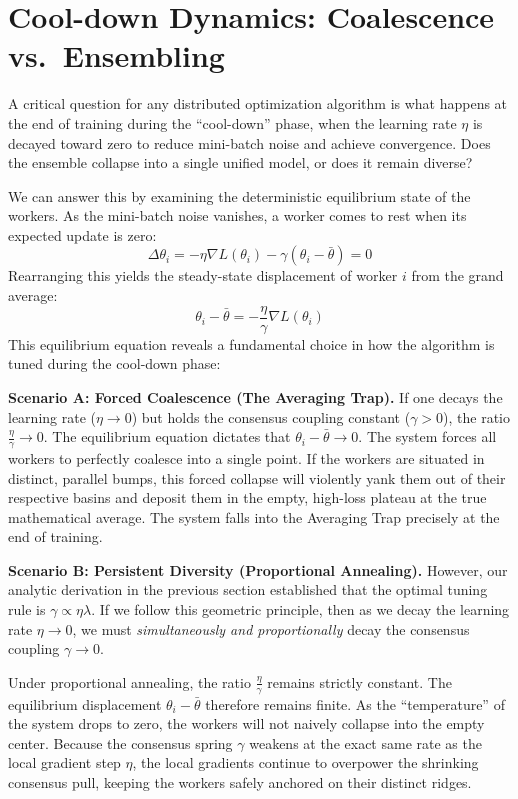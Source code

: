 \documentclass{article}
\begin{document}
\section{Cool-down Dynamics: Coalescence vs.\ Ensembling}

A critical question for any distributed optimization algorithm is what happens at the end of training during the ``cool-down'' phase, when the learning rate $\eta$ is decayed toward zero to reduce mini-batch noise and achieve convergence. Does the ensemble collapse into a single unified model, or does it remain diverse?

We can answer this by examining the deterministic equilibrium state of the workers. As the mini-batch noise vanishes, a worker comes to rest when its expected update is zero:
\[
\Delta \theta_i = -\eta \nabla L(\theta_i) - \gamma(\theta_i - \bar{\theta}) = 0
\]
Rearranging this yields the steady-state displacement of worker $i$ from the grand average:
\[
\theta_i - \bar{\theta} = -\frac{\eta}{\gamma} \nabla L(\theta_i)
\]
This equilibrium equation reveals a fundamental choice in how the algorithm is tuned during the cool-down phase:

\textbf{Scenario A: Forced Coalescence (The Averaging Trap).} If one decays the learning rate ($\eta \to 0$) but holds the consensus coupling constant ($\gamma > 0$), the ratio $\frac{\eta}{\gamma} \to 0$. The equilibrium equation dictates that $\theta_i - \bar{\theta} \to 0$. The system forces all workers to perfectly coalesce into a single point. If the workers are situated in distinct, parallel bumps, this forced collapse will violently yank them out of their respective basins and deposit them in the empty, high-loss plateau at the true mathematical average. The system falls into the Averaging Trap precisely at the end of training.

\textbf{Scenario B: Persistent Diversity (Proportional Annealing).} However, our analytic derivation in the previous section established that the optimal tuning rule is $\gamma \propto \eta \lambda$. If we follow this geometric principle, then as we decay the learning rate $\eta \to 0$, we must \emph{simultaneously and proportionally} decay the consensus coupling $\gamma \to 0$. 

Under proportional annealing, the ratio $\frac{\eta}{\gamma}$ remains strictly constant. The equilibrium displacement $\theta_i - \bar{\theta}$ therefore remains finite. As the ``temperature'' of the system drops to zero, the workers will not naively collapse into the empty center. Because the consensus spring $\gamma$ weakens at the exact same rate as the local gradient step $\eta$, the local gradients continue to overpower the shrinking consensus pull, keeping the workers safely anchored on their distinct ridges. 
\end{document}
